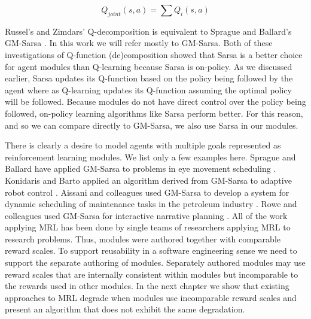 \begin{equation}\label{eqn:joint-q}
  Q_{joint}(s, a) = \sum Q_i(s, a)
\end{equation}

Russel's and Zimdars' Q-decomposition \cite{russell2003q-decomposition} is equivalent to Sprague and Ballard's GM-Sarsa \cite{sprague2003multiple-goal}. In this work we will refer mostly to GM-Sarsa. Both of these investigations of Q-function (de)composition showed that Sarsa is a better choice for agent modules than Q-learning because Sarsa is on-policy. As we discussed earlier, Sarsa updates its Q-function based on the policy being followed by the agent where as Q-learning updates its Q-function assuming the optimal policy will be followed. Because modules do not have direct control over the policy being followed, on-policy learning algorithms like Sarsa perform better. For this reason, and so we can compare directly to GM-Sarsa, we also use Sarsa in our modules.

There is clearly a desire to model agents with multiple goals represented as reinforcement learning modules. We list only a few examples here. Sprague and Ballard have applied GM-Sarsa to problems in eye movement scheduling \cite{sprague2003eye,sprague2007modeling}. Konidaris and Barto applied an algorithm derived from GM-Sarsa to adaptive robot control \cite{konidaris2006adaptive}. Aissani and colleagues used GM-Sarsa to develop a system for dynamic scheduling of maintenance tasks in the petroleum industry \cite{aissani2009dynamic,chaari2014scheduling}. Rowe and colleagues used GM-Sarsa for interactive narrative planning \cite{rowe2013modular}. All of the work applying MRL has been done by single teams of researchers applying MRL to research problems. Thus, modules were authored together with comparable reward scales. To support reusability in a software engineering sense we need to support the separate authoring of modules. Separately authored modules may use reward scales that are internally consistent within modules but incomparable to the rewards used in other modules. In the next chapter we show that existing approaches to MRL degrade when modules use incomparable reward scales and present an algorithm that does not exhibit the same degradation.
